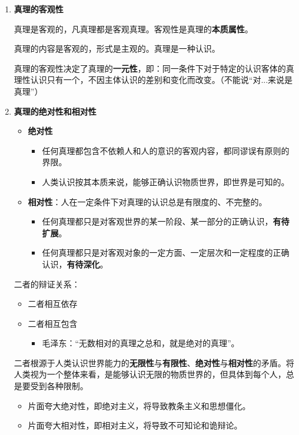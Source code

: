 \documentclass[12pt, a4paper, oneside]{ctexart}
\begin{document}
\begin{enumerate}
  \item {\bf 真理的客观性}
  
  真理是客观的，凡真理都是客观真理。客观性是真理的\textbf{本质属性}。

  真理的内容是客观的，形式是主观的。真理是一种认识。

  真理的客观性决定了真理的\textbf{一元性}，即：同一条件下对于特定的认识客体的真理性认识只有一个，不因主体认识的差别和变化而改变。（不能说“对...来说是真理”）

  \item {\bf 真理的绝对性和相对性}
  
  \begin{itemize}
    \item {\bf 绝对性}
    \begin{itemize}
      \item 任何真理都包含不依赖人和人的意识的客观内容，都同谬误有原则的界限。
      \item 人类认识按其本质来说，能够正确认识物质世界，即世界是可知的。
    \end{itemize}
    \item {\bf 相对性}：人在一定条件下对真理的认识总是有限度的、不完整的。
    \begin{itemize}
      \item 任何真理都只是对客观世界的某一阶段、某一部分的正确认识，\textbf{有待扩展}。
      \item 任何真理都只是对客观对象的一定方面、一定层次和一定程度的正确认识，\textbf{有待深化}。
    \end{itemize}
  \end{itemize}

  二者的辩证关系：
  \begin{itemize}
    \item 二者相互依存
    \item 二者相互包含
    \begin{itemize}
      \item 毛泽东：“无数相对的真理之总和，就是绝对的真理”。
    \end{itemize}
  \end{itemize}

  二者根源于人类认识世界能力的\textbf{无限性}与\textbf{有限性}、\textbf{绝对性}与\textbf{相对性}的矛盾。将人类视为一个整体来看，是能够认识无限的物质世界的，但具体到每个人，总是要受到各种限制。

  \begin{itemize}
    \item 片面夸大绝对性，即绝对主义，将导致教条主义和思想僵化。
    \item 片面夸大相对性，即相对主义，将导致不可知论和诡辩论。
  \end{itemize}


\end{enumerate}
\end{document}
